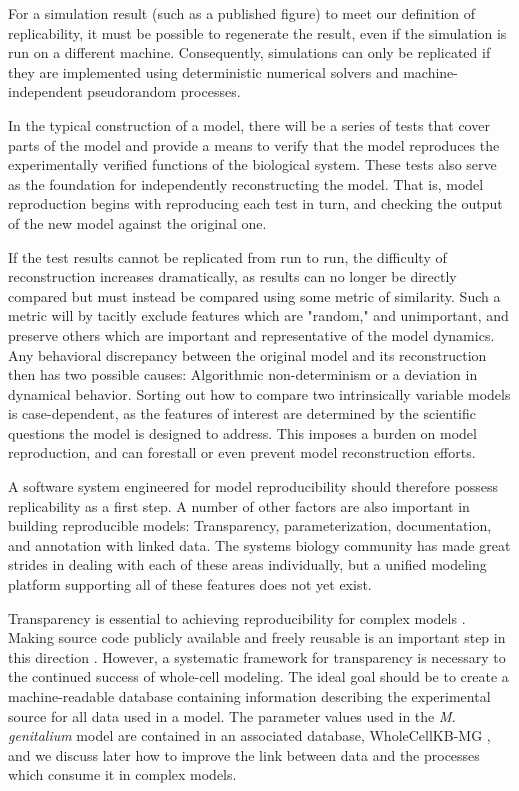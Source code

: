 \documentclass[journal,transmag,twoside]{IEEEtran}
\begin{document}
For a simulation result (such as a published figure) to meet our definition of replicability,
it must be possible to regenerate the result,
even if the simulation is run on a different machine.
Consequently, simulations can only be replicated if they are implemented using deterministic numerical solvers and
machine-independent pseudorandom processes.

In the typical construction of a model, there will be a series of tests
that cover parts of the model and provide a means to verify
that the model reproduces the experimentally verified functions of the biological system.
These tests also serve as the foundation for independently reconstructing the model.
That is, model reproduction begins with reproducing each test in turn, and checking
the output of the new model against the original one.

If the test results cannot be replicated from run to run, the difficulty of reconstruction
increases dramatically, as results can no longer be directly compared but must instead
be compared using some metric of similarity.
Such a metric will by tacitly exclude features which are "random," and unimportant, and
preserve others which are important and representative of the model dynamics.
Any behavioral discrepancy between the original model and its reconstruction
then has two possible causes: Algorithmic non-determinism or a deviation in dynamical
behavior.
Sorting out how to compare two intrinsically variable models is case-dependent,
as the features of interest are determined by the scientific questions the model is
designed to address.
This imposes a burden on model reproduction, and can forestall or even prevent
model reconstruction efforts.

A software system engineered for model reproducibility should therefore possess
replicability as a first step. A number of other factors are also important in
building reproducible models: Transparency, parameterization, documentation,
and annotation with linked data.
The systems biology community has made great strides in dealing with each of these
areas individually, but a unified modeling platform supporting all of these
features does not yet exist.

Transparency is essential to achieving reproducibility for complex models \cite{boulton2012open}.
Making source code publicly available and freely reusable is an important step in this direction \cite{easterbrook2014open}.
However, a systematic framework for transparency is necessary to the continued success of whole-cell modeling.
The ideal goal should be to create a machine-readable database containing information describing the experimental source for all data used in a model.
The parameter values used in the \textit{M. genitalium} model are contained in an associated database, WholeCellKB-MG \cite{karr2013wholecellkb},
and we discuss later how to improve the link between data and the processes which consume it in complex models.
\end{document}
